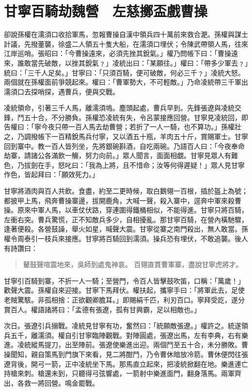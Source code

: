 
\chapter{甘寧百騎劫魏營　左慈擲盃戲曹操}

卻說孫權在濡須口收拾軍馬，忽報曹操自漢中領兵四十萬前來救合淝。孫權與謀士計議，先撥董襲，徐盛二人領五十隻大船，在濡須口埋伏；令陳武帶領人馬，往來江岸巡哨。張昭曰：「今曹操遠來，必須先挫其銳氣。」權乃問帳下曰：「曹操遠來，誰敢當先破敵，以挫其銳氣﹖」凌統出曰：「某願往。」權曰：「帶多少軍去﹖」統曰：「三千人足矣。」甘寧曰：「只須百騎，便可破敵，何必三千﹖」凌統大怒。兩個就在孫權面前爭競起來。權曰：「曹軍勢大，不可輕敵。」乃命凌統帶三千軍出濡須口去探哨探，遇曹兵，便與交戰。

凌統領命，引著三千人馬，離濡須塢。塵頭起處，曹兵早到。先鋒張遼與凌統交鋒，鬥五十合，不分勝負。孫權恐凌統有失，令呂蒙接應回營。甘寧見凌統回，即告權曰：「寧今夜只帶一百人馬去劫曹營；若折了一人一騎，也不算功。」孫權壯之，乃調撥帳下一百精銳馬兵付寧，又以酒五十瓶，羊肉五十斤，賞賜軍士。甘寧回到寨中。教一百人皆列坐，先將銀碗斟酒，自吃兩碗。乃語百人曰：「今夜奉命劫寨，請諸公各滿飲一觴，努力向前。」眾人聞言，面面相覷。甘寧見眾人有難色，乃拔劍在手，怒叱曰：「我為上將，且不惜命；汝等何得遲疑！」眾人見甘寧作色，皆起拜曰：「願效死力。」

甘寧將酒肉與百人共飲。食盡，約至二更時候，取白鵝翎一百根，插於盔上為號；都披甲上馬，飛奔曹操寨邊，拔開鹿角，大喊一聲，殺入寨中，逕奔中軍來殺曹操。原來中軍人馬，以車仗伏路，穿連圍得鐵桶相似，不能得進。甘寧只將百騎，左衝右突。曹兵驚慌，正不知敵兵多少，自相擾亂。那甘寧百騎，在營內橫馳驟，逢著便殺。各營鼓譟，舉火如星，喊聲大震。甘寧從寨之南門殺出，無人敢當。孫權令周泰引一枝兵來接應。甘寧將百騎回到濡須。操兵恐有埋伏，不敢追襲。後人有詩讚曰：

\begin{quote}
鼙鼓聲喧震地來，吳師到處鬼神哀。
百翎直貫曹軍寨，盡說甘寧虎將才。
\end{quote}

甘寧引百騎到寨，不折一人一騎；至營門，令百人皆擊鼓吹笛，口稱：「萬歲！」歡聲大震。孫權自來迎接。甘寧下馬拜伏。權扶起，攜寧手曰：「將軍此去，足使老賊驚駭。非孤相捨：正欲觀卿膽耳。」即賜絹千匹，利刃百口。寧拜受訖，遂分賞百人。權語諸將曰：「孟德有張遼，孤有甘興霸，足以相敵也。」

次日。張遼引兵搦戰。凌統見甘寧有功，奮然曰：「統願敵張遼。」權許之。統遂領兵五千，離濡須。權自引甘寧臨陣觀戰。對陣圓處，張遼出馬，左有李典，右有樂進。凌統縱馬提刀，出至陣前。張遼使樂進出迎。兩個鬥至五十合，未分勝敗。曹操聞知，親自策馬到門旗下來看，見二將酣鬥，乃令曹休暗放冷箭。曹休便閃往張遼背後，開弓一箭，正中凌統坐下馬。那馬直立起來，把凌統掀翻在地。樂進連亡持槍來刺。槍還未到，只聽得弓弦響處，一箭射中樂進面門，翻身落馬。兩軍齊出，各救一將回營。鳴金罷戰。

